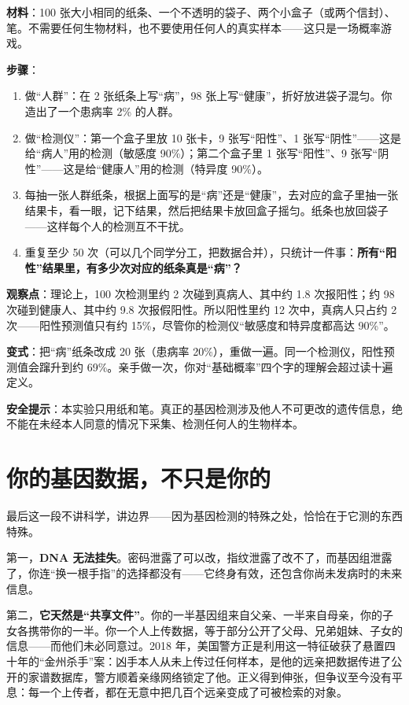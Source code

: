 \begin{shiyan}
\textbf{材料}：100 张大小相同的纸条、一个不透明的袋子、两个小盒子（或两个信封）、笔。不需要任何生物材料，也不要使用任何人的真实样本——这只是一场概率游戏。

\textbf{步骤}：
\begin{enumerate}[itemsep=1pt]
\item 做“人群”：在 2 张纸条上写“病”，98 张上写“健康”，折好放进袋子混匀。你造出了一个患病率 2\% 的人群。
\item 做“检测仪”：第一个盒子里放 10 张卡，9 张写“阳性”、1 张写“阴性”——这是给“病人”用的检测（敏感度 90\%）；第二个盒子里 1 张写“阳性”、9 张写“阴性”——这是给“健康人”用的检测（特异度 90\%）。
\item 每抽一张人群纸条，根据上面写的是“病”还是“健康”，去对应的盒子里抽一张结果卡，看一眼，记下结果，然后把结果卡放回盒子摇匀。纸条也放回袋子——这样每个人的检测互不干扰。
\item 重复至少 50 次（可以几个同学分工，把数据合并），只统计一件事：\textbf{所有“阳性”结果里，有多少次对应的纸条真是“病”？}
\end{enumerate}

\textbf{观察点}：理论上，100 次检测里约 2 次碰到真病人、其中约 1.8 次报阳性；约 98 次碰到健康人、其中约 9.8 次报假阳性。所以阳性里约 12 次中，真病人只占约 2 次——阳性预测值只有约 15\%，尽管你的检测仪“敏感度和特异度都高达 90\%”。

\textbf{变式}：把“病”纸条改成 20 张（患病率 20\%），重做一遍。同一个检测仪，阳性预测值会蹿升到约 69\%。亲手做一次，你对“基础概率”四个字的理解会超过读十遍定义。

\textbf{安全提示}：本实验只用纸和笔。真正的基因检测涉及他人不可更改的遗传信息，绝不能在未经本人同意的情况下采集、检测任何人的生物样本。
\end{shiyan}

\section{你的基因数据，不只是你的}

最后这一段不讲科学，讲边界——因为基因检测的特殊之处，恰恰在于它测的东西特殊。

第一，\textbf{DNA 无法挂失}。密码泄露了可以改，指纹泄露了改不了，而基因组泄露了，你连“换一根手指”的选择都没有——它终身有效，还包含你尚未发病时的未来信息。

第二，\textbf{它天然是“共享文件”}。你的一半基因组来自父亲、一半来自母亲，你的子女各携带你的一半。你一个人上传数据，等于部分公开了父母、兄弟姐妹、子女的信息——而他们未必同意过。2018 年，美国警方正是利用这一特征破获了悬置四十年的“金州杀手”案：凶手本人从未上传过任何样本，是他的远亲把数据传进了公开的家谱数据库，警方顺着亲缘网络锁定了他。正义得到伸张，但争议至今没有平息：每一个上传者，都在无意中把几百个远亲变成了可被检索的对象。

